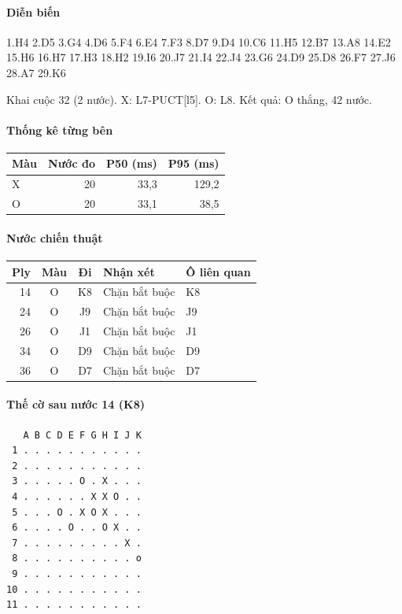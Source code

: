 \paragraph{Diễn biến}
{\footnotesize 1.H4 2.D5 3.G4 4.D6 5.F4 6.E4 7.F3 8.D7 9.D4 10.C6 11.H5 12.B7 13.A8 14.E2 15.H6 16.H7 17.H3 18.H2 19.I6 20.J7 21.I4 22.J4 23.G6 24.D9 25.D8 26.F7 27.J6 28.A7 29.K6\par}
Khai cuộc 32 (2 nước). X: L7-PUCT[l5]. O: L8. Kết quả: O thắng, 42 nước.
\paragraph{Thống kê từng bên}
\begin{center}\small
\begin{tabular}{@{}lrrr@{}}
\toprule
Màu & Nước đo & P50 (ms) & P95 (ms) \\
\midrule
X & 20 & 33,3 & 129,2 \\
O & 20 & 33,1 & 38,5 \\
\bottomrule
\end{tabular}
\end{center}
\paragraph{Nước chiến thuật}
\begin{center}\small
\begin{tabular}{@{}rccll@{}}
\toprule
Ply & Màu & Đi & Nhận xét & Ô liên quan \\
\midrule
14 & O & K8 & Chặn bắt buộc & K8 \\
24 & O & J9 & Chặn bắt buộc & J9 \\
26 & O & J1 & Chặn bắt buộc & J1 \\
34 & O & D9 & Chặn bắt buộc & D9 \\
36 & O & D7 & Chặn bắt buộc & D7 \\
\bottomrule
\end{tabular}
\end{center}
\paragraph{Thế cờ sau nước 14 (K8)}
\begin{verbatim}
   A B C D E F G H I J K
 1 . . . . . . . . . . .
 2 . . . . . . . . . . .
 3 . . . . . O . X . . .
 4 . . . . . . X X O . .
 5 . . . O . X O X . . .
 6 . . . . O . . O X . .
 7 . . . . . . . . . X .
 8 . . . . . . . . . . o
 9 . . . . . . . . . . .
10 . . . . . . . . . . .
11 . . . . . . . . . . .
\end{verbatim}
